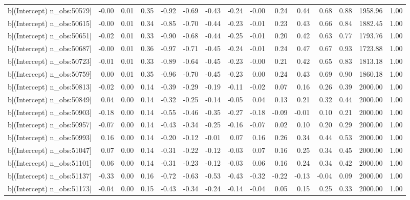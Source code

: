 \begin{table}[ht]
\begin{tabular}{rrrrrrrrrrrrrrr}
  b[(Intercept) n\_obs:50579] & -0.00 & 0.01 & 0.35 & -0.92 & -0.69 & -0.43 & -0.24 & -0.00 & 0.24 & 0.44 & 0.68 & 0.88 & 1958.96 & 1.00 \\ 
  b[(Intercept) n\_obs:50615] & -0.00 & 0.01 & 0.34 & -0.85 & -0.70 & -0.44 & -0.23 & -0.01 & 0.23 & 0.43 & 0.66 & 0.84 & 1882.45 & 1.00 \\ 
  b[(Intercept) n\_obs:50651] & -0.02 & 0.01 & 0.33 & -0.90 & -0.68 & -0.44 & -0.25 & -0.01 & 0.20 & 0.42 & 0.63 & 0.77 & 1793.76 & 1.00 \\ 
  b[(Intercept) n\_obs:50687] & -0.00 & 0.01 & 0.36 & -0.97 & -0.71 & -0.45 & -0.24 & -0.01 & 0.24 & 0.47 & 0.67 & 0.93 & 1723.88 & 1.00 \\ 
  b[(Intercept) n\_obs:50723] & -0.01 & 0.01 & 0.33 & -0.89 & -0.64 & -0.45 & -0.23 & -0.00 & 0.21 & 0.42 & 0.65 & 0.83 & 1813.18 & 1.00 \\ 
  b[(Intercept) n\_obs:50759] & 0.00 & 0.01 & 0.35 & -0.96 & -0.70 & -0.45 & -0.23 & 0.00 & 0.24 & 0.43 & 0.69 & 0.90 & 1860.18 & 1.00 \\ 
  b[(Intercept) n\_obs:50813] & -0.02 & 0.00 & 0.14 & -0.39 & -0.29 & -0.19 & -0.11 & -0.02 & 0.07 & 0.16 & 0.26 & 0.39 & 2000.00 & 1.00 \\ 
  b[(Intercept) n\_obs:50849] & 0.04 & 0.00 & 0.14 & -0.32 & -0.25 & -0.14 & -0.05 & 0.04 & 0.13 & 0.21 & 0.32 & 0.44 & 2000.00 & 1.00 \\ 
  b[(Intercept) n\_obs:50903] & -0.18 & 0.00 & 0.14 & -0.55 & -0.46 & -0.35 & -0.27 & -0.18 & -0.09 & -0.01 & 0.10 & 0.21 & 2000.00 & 1.00 \\ 
  b[(Intercept) n\_obs:50957] & -0.07 & 0.00 & 0.14 & -0.43 & -0.34 & -0.25 & -0.16 & -0.07 & 0.02 & 0.10 & 0.20 & 0.29 & 2000.00 & 1.00 \\ 
  b[(Intercept) n\_obs:50993] & 0.16 & 0.00 & 0.14 & -0.20 & -0.12 & -0.01 & 0.07 & 0.16 & 0.26 & 0.34 & 0.44 & 0.53 & 2000.00 & 1.00 \\ 
  b[(Intercept) n\_obs:51047] & 0.07 & 0.00 & 0.14 & -0.31 & -0.22 & -0.12 & -0.03 & 0.07 & 0.16 & 0.25 & 0.34 & 0.45 & 2000.00 & 1.00 \\ 
  b[(Intercept) n\_obs:51101] & 0.06 & 0.00 & 0.14 & -0.31 & -0.23 & -0.12 & -0.03 & 0.06 & 0.16 & 0.24 & 0.34 & 0.42 & 2000.00 & 1.00 \\ 
  b[(Intercept) n\_obs:51137] & -0.33 & 0.00 & 0.16 & -0.72 & -0.63 & -0.53 & -0.43 & -0.32 & -0.22 & -0.13 & -0.04 & 0.09 & 2000.00 & 1.00 \\ 
  b[(Intercept) n\_obs:51173] & -0.04 & 0.00 & 0.15 & -0.43 & -0.34 & -0.24 & -0.14 & -0.04 & 0.05 & 0.15 & 0.25 & 0.33 & 2000.00 & 1.00 \\ 

\end{tabular}
\end{table}
